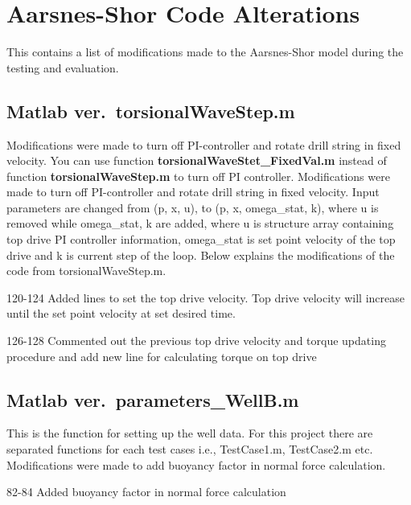 \chapter{Aarsnes-Shor Code Alterations}
This \appendixname{} contains a list of modifications made to the Aarsnes-Shor model during the testing and evaluation.

\section{Matlab ver.\ {\codefont torsionalWaveStep.m}}
Modifications were made to turn off PI-controller and rotate drill string in fixed velocity. You can use function \textbf{torsionalWaveStet\_FixedVal.m} instead of function \textbf{torsionalWaveStep.m} to turn off PI controller. Modifications were made to turn off PI-controller and rotate drill string in fixed velocity. Input parameters are changed from (p, x, u), to (p, x, omega\_stat, k), where u is removed while omega\_stat, k are added, where u is structure array containing top drive PI controller information, omega\_stat is set point velocity of the top drive and k is current step of the loop. Below explains the modifications of the code from torsionalWaveStep.m.

\begin{codemodifications}
\begin{codemodification}{120-124}
Added lines to set the top drive velocity. Top drive velocity will increase until the set point velocity at set desired time.
\end{codemodification}

\begin{codemodification}{126-128}
Commented out the previous top drive velocity and torque updating procedure and add new line for calculating torque on top drive
\end{codemodification}
\end{codemodifications}

\section{Matlab ver.\ {\codefont parameters\_WellB.m}}
This is the function for setting up the well data. For this project there are separated functions for each test cases i.e., TestCase1.m, TestCase2.m etc. Modifications were made to add buoyancy factor in normal force calculation.
\begin{codemodifications}
\begin{codemodification}{82-84}
Added buoyancy factor in normal force calculation
\end{codemodification}
\end{codemodifications}

